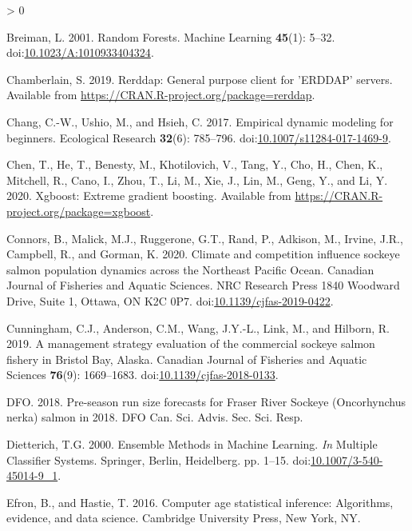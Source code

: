 \documentclass[
]{article}
\newlength{\cslhangindent}
\newenvironment{CSLReferences}[2] %
 {%
  \setlength{\parindent}{0pt}
  \ifodd #1 \everypar{\setlength{\hangindent}{\cslhangindent}}\ignorespaces\fi
  \ifnum #2 > 0
  \setlength{\parskip}{#2\baselineskip}
  \fi
 }%
 {}
\begin{document}
\begin{CSLReferences}{1}{0}
\leavevmode\hypertarget{ref-breiman2001}{}%
Breiman, L. 2001. Random {Forests}. Machine Learning \textbf{45}(1): 5--32. doi:\href{https://doi.org/10.1023/A:1010933404324}{10.1023/A:1010933404324}.

\leavevmode\hypertarget{ref-chamberlain2019}{}%
Chamberlain, S. 2019. Rerddap: General purpose client for 'ERDDAP' servers. Available from \url{https://CRAN.R-project.org/package=rerddap}.

\leavevmode\hypertarget{ref-chang2017}{}%
Chang, C.-W., Ushio, M., and Hsieh, C. 2017. Empirical dynamic modeling for beginners. Ecological Research \textbf{32}(6): 785--796. doi:\href{https://doi.org/10.1007/s11284-017-1469-9}{10.1007/s11284-017-1469-9}.

\leavevmode\hypertarget{ref-chen2020}{}%
Chen, T., He, T., Benesty, M., Khotilovich, V., Tang, Y., Cho, H., Chen, K., Mitchell, R., Cano, I., Zhou, T., Li, M., Xie, J., Lin, M., Geng, Y., and Li, Y. 2020. Xgboost: Extreme gradient boosting. Available from \url{https://CRAN.R-project.org/package=xgboost}.

\leavevmode\hypertarget{ref-connors2020}{}%
Connors, B., Malick, M.J., Ruggerone, G.T., Rand, P., Adkison, M., Irvine, J.R., Campbell, R., and Gorman, K. 2020. Climate and competition influence sockeye salmon population dynamics across the {Northeast Pacific Ocean}. Canadian Journal of Fisheries and Aquatic Sciences. {NRC Research Press 1840 Woodward Drive, Suite 1, Ottawa, ON K2C 0P7}. doi:\href{https://doi.org/10.1139/cjfas-2019-0422}{10.1139/cjfas-2019-0422}.

\leavevmode\hypertarget{ref-cunningham2019}{}%
Cunningham, C.J., Anderson, C.M., Wang, J.Y.-L., Link, M., and Hilborn, R. 2019. A management strategy evaluation of the commercial sockeye salmon fishery in {Bristol Bay}, {Alaska}. Canadian Journal of Fisheries and Aquatic Sciences \textbf{76}(9): 1669--1683. doi:\href{https://doi.org/10.1139/cjfas-2018-0133}{10.1139/cjfas-2018-0133}.

\leavevmode\hypertarget{ref-dfo2018}{}%
DFO. 2018. Pre-season run size forecasts for {Fraser River Sockeye} ({Oncorhynchus} nerka) salmon in 2018. {DFO Can. Sci. Advis. Sec. Sci. Resp}.

\leavevmode\hypertarget{ref-Dietterich2000}{}%
Dietterich, T.G. 2000. Ensemble {Methods} in {Machine Learning}. \emph{In} Multiple {Classifier Systems}. {Springer, Berlin, Heidelberg}. pp. 1--15. doi:\href{https://doi.org/10.1007/3-540-45014-9_1}{10.1007/3-540-45014-9\_1}.

\leavevmode\hypertarget{ref-efron2016}{}%
Efron, B., and Hastie, T. 2016. Computer age statistical inference: Algorithms, evidence, and data science. {Cambridge University Press}, {New York, NY}.


\end{CSLReferences}
\end{document}
